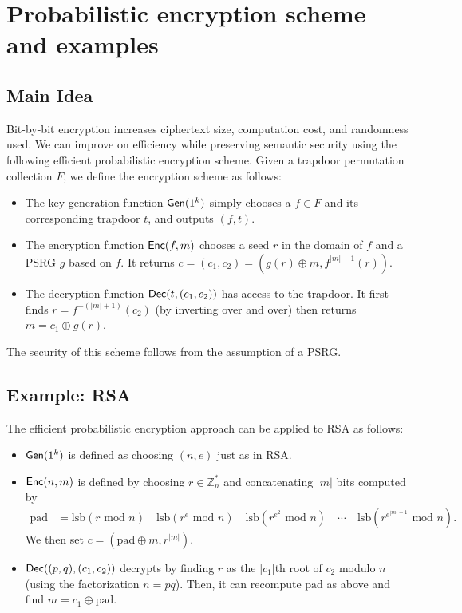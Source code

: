 \documentclass[10pt]{article}
\begin{document}
\section{Probabilistic encryption scheme and examples}

\subsection{Main Idea}

Bit-by-bit encryption increases ciphertext size, computation cost, and randomness used. We can improve on efficiency while preserving semantic security using the following efficient probabilistic encryption scheme. Given a trapdoor permutation collection $F$, we define the encryption scheme as follows:
\begin{itemize}
	\item The key generation function $\mathsf{Gen}(1^k)$ simply chooses a $f\in F$ and its corresponding trapdoor $t$, and outputs $(f, t)$.
	\item The encryption function $\mathsf{Enc}(f, m)$ chooses a seed $r$ in the domain of $f$ and a PSRG $g$ based on $f$. It returns $c = (c_1, c_2) = (g(r)\oplus m, f^{|m|+1}(r))$.
	\item The decryption function $\mathsf{Dec}(t, (c_1, c_2))$ has access to the trapdoor. It first finds $r = f^{-(|m|+1)}(c_2)$ (by inverting over and over) then returns $m=c_1 \oplus g(r)$.
\end{itemize}
The security of this scheme follows from the assumption of a PSRG. \cite{BG}

\subsection{Example: RSA}

The efficient probabilistic encryption approach can be applied to RSA as follows:
\begin{itemize}
	\item $\mathsf{Gen}(1^k)$ is defined as choosing $(n,e)$ just as in RSA.
	\item $\mathsf{Enc}(n,m)$ is defined by choosing $r \in \mathbb{Z}_n^{*}$ and concatenating $|m|$ bits computed by
	\begin{align*}
	\text{pad} &= \text{lsb}(r \text{ mod } n) \quad \text{lsb}(r^e \text{ mod } n) \quad  \text{lsb}(r^{e^2} \text{ mod } n) \quad  \cdots \quad  \text{lsb}(r^{e^{|m|-1}} \text{ mod } n).
	\end{align*}
	We then set $c=( \text{pad} \oplus m, r^{|m|})$.
	\item $\mathsf{Dec}((p,q),(c_1, c_2))$ decrypts by finding $r$ as the $|c_1|$th root of $c_2$ modulo $n$ (using the factorization $n=pq$). Then, it can recompute $\text{pad}$ as above and find $m = c_1 \oplus \text{pad}$.
\end{itemize}
\end{document}
